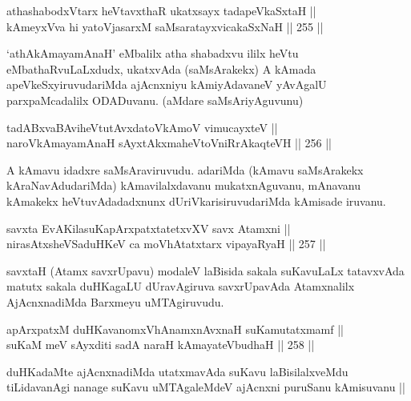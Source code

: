 \begin{shl}
athashabodxV\s tarx heVtavxthaR ukatxsayx tadapeVkaSxtaH || \\
kAmeyxVva hi yatoV\s jasarxM saMsaratayxvicakaSxNaH ||  255 ||  
\end{shl}

\begin{artha}
`athAkAmayamAnaH' eMbalilx atha shabadxvu ililx heVtu eMbathaRvuLaLxdudx,
ukatxvAda (saMsArakekx) A kAmada apeVkeSxyiruvudariMda ajAcnxniyu
kAmiyAdavaneV yAvAgalU parxpaMcadalilx ODADuvanu. (aMdare saMsAriyAguvunu)
\end{artha}

\begin{shl}
tadABxvaBAviheVtutAvxdatoV\s kAmoV vimucayxteV ||  \\
naroV\s kAmayamAnaH sAyxtAkxmaheVtoVniRrAkaqteVH ||  256 ||  
\end{shl}

\begin{artha}
A kAmavu idadxre saMsAraviruvudu. adariMda (kAmavu saMsArakekx
kAraNavAdudariMda) kAmavilalxdavanu mukatxnAguvanu, mAnavanu kAmakekx
heVtuvAdadadxnunx dUriVkarisiruvudariMda kAmisade iruvanu.
\end{artha}


\begin{shl}
savxta EvAKilasuKapArxpatxtatetxvXV savx Atamxni || \\
nirasAtxsheVSaduHKeV ca moVhAtatxtarx vipayaRyaH ||  257 ||  
\end{shl}

\begin{artha}
savxtaH (Atamx savxrUpavu) modaleV laBisida sakala suKavuLaLx
tatavxvAda matutx sakala duHKagaLU dUravAgiruva savxrUpavAda
Atamxnalilx AjAcnxnadiMda Barxmeyu uMTAgiruvudu.
\end{artha}


\begin{shl}
apArxpatxM duHKavanomxVhAnamxnAvxnaH suKamutatxmamf || \\
suKaM meV sAyxditi sadA naraH kAmayateV\s budhaH ||  258 ||  
\end{shl}

\begin{artha}
duHKadaMte ajAcnxnadiMda utatxmavAda suKavu laBisilalxveMdu
tiLidavanAgi nanage suKavu uMTAgaleMdeV ajAcnxni puruSanu kAmisuvanu ||
\end{artha}

